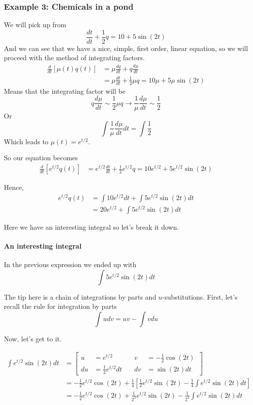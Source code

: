 \subsubsection{Example 3: Chemicals in a pond}

We will pick up from
$$
\frac{dt}{dt} + \frac{1}{2}q = 10 + 5\sin(2t)
$$
And we can see that we have a nice, simple, first order, linear equation, so we will proceed with
the method of integrating factors.
\begin{align*}
\frac{d}{dt} \left[ \mu(t) q(t) \right] &= \mu \frac{dq}{dt} + q\frac{d\mu}{dt} \\
&= \mu\frac{dt}{dt} + \frac{1}{2}\mu q = 10\mu + 5\mu\sin(2t)
\end{align*}
Means that the integrating factor will be
$$
q\frac{d\mu}{dt} \sim \frac{1}{2}\mu q \rightarrow
\frac{1}{\mu}\frac{d\mu}{dt} \sim \frac{1}{2}
$$
Or
$$
\int \frac{1}{\mu}\frac{d\mu}{dt} dt = \int \frac{1}{2}
$$
Which leads to $\mu(t) = e^{t/2}$.

So our equation becomes
\begin{align*}
\frac{d}{dt} \left[ e^{t/2} q(t) \right] &= e^{t/2} \frac{dt}{dt} + \frac{1}{2} e^{t/2} q = 10 e^{t/2} + 5 e^{t/2} \sin(2t)
\end{align*}

Hence,
\begin{align*}
e^{t/2} q(t) &= \int 10 e^{t/2} dt + \int 5 e^{t/2} \sin(2t) dt \\
&= 20 e^{t/2} + \int 5 e^{t/2} \sin(2t) dt
\end{align*}

Here we have an interesting integral so let's break it down.

\paragraph{An interesting integral}

In the previous expression we ended up with
$$
\int 5 e^{t/2} \sin(2t) dt
$$

The tip here is a chain of integrations by parts and $u$-substitutions.
First, let's recall the rule for integration by parts
$$
\int u dv = uv - \int v du
$$

Now, let's get to it.

\begin{align*}
    \int e^{t/2} \sin(2t) dt &= 
    \left[
      \begin{alignedat}{2}
      u  &= e^{t/2}               \quad & v  &= -\frac{1}{2}\cos(2t) \\
      du &= \frac{1}{2}e^{t/2}dt  \quad & dv &= \sin(2t) dt 
      \end{alignedat}\,
    \right] \\
    &=
    -\frac{1}{2}e^{t/2}\cos(2t) + \frac{1}{4} \left[ 
        \frac{1}{2}e^{t/2}\sin(2t) - \frac{1}{4} \int e^{t/2} \sin(2t) dt
    \right] \\
    &= -\frac{1}{2}e^{t/2}\cos(2t) + \frac{1}{2^3} e^{t/2}\sin(2t)
      - \frac{1}{2^4} \int e^{t/2}\sin(2t) dt
\end{align*}

